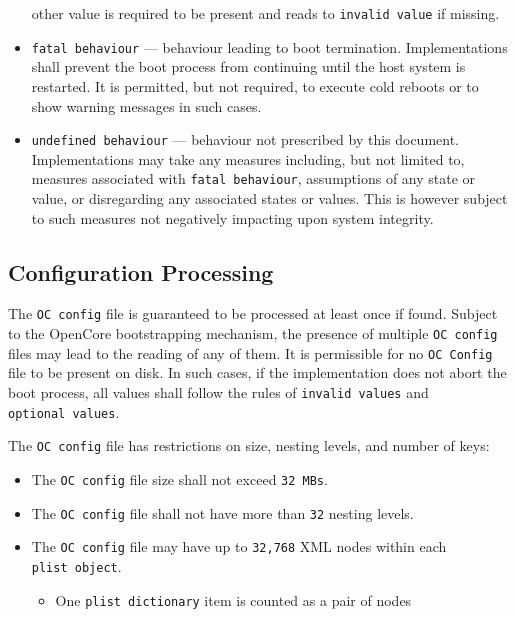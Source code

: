 \documentclass[]{article}
\makeatletter
\providecommand{\tightlist}{%
  \setlength{\itemsep}{0pt}\setlength{\parskip}{0pt}}
\renewcommand{\label}[1]{%
\zref@wrapper@immediate{\oldlabel{#1}}}  %
\makeatother
\begin{document}
\begin{itemize}
  other value is required to be present and reads to
  \texttt{invalid\ value} if missing.
\item
  \texttt{fatal\ behaviour} --- behaviour leading to boot termination.
  Implementations shall prevent the boot process from continuing until
  the host system is restarted. It is permitted, but not required, to
  execute cold reboots or to show warning messages in such cases.
\item
  \texttt{undefined\ behaviour} --- behaviour not prescribed by this
  document. Implementations may take any measures including, but not
  limited to, measures associated with \texttt{fatal\ behaviour}, assumptions
  of any state or value, or disregarding any associated states or values. This is
  however subject to such measures not negatively impacting upon system integrity.
\end{itemize}

\subsection{Configuration Processing}\label{configuration-processing}

The \texttt{OC\ config} file is guaranteed to be processed at least once if found.
Subject to the OpenCore bootstrapping mechanism, the presence of multiple
\texttt{OC\ config} files may lead to the reading of any of them. It is
permissible for no \texttt{OC\ Config} file to be present on disk. In such cases,
if the implementation does not abort the boot process, all values shall follow the
rules of \texttt{invalid\ values} and \texttt{optional\ values}.

The \texttt{OC\ config} file has restrictions on size, nesting levels, and number of keys:

\begin{itemize}
\tightlist
\item
  The \texttt{OC\ config} file size shall not exceed \texttt{32\ MBs}.
\item
  The \texttt{OC\ config} file shall not have more than \texttt{32} nesting levels.
\item
  The \texttt{OC\ config} file may have up to \texttt{32,768} XML nodes within
  each \texttt{plist\ object}.
  \begin{itemize}
  \tightlist
    \item One \texttt{plist\ dictionary} item is counted as a pair of nodes
  \end{itemize} \medskip
\end{itemize}
\end{document}
